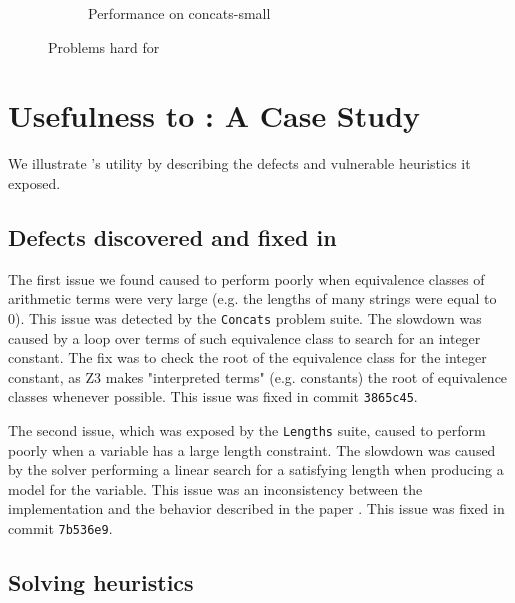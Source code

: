 \begin{figure}[h]
\begin{subfigure}{.5\textwidth}
            \label{fig:concats-small}
            \vspace{-0.25in}
            \caption{Performance on concats-small}
        \end{subfigure}
        \vspace{-0.1in}
        \caption{Problems hard for \us{}}
        \label{fig:z3str3-hard}
        \vspace{-0.3in}
    \end{figure}

    
\section{Usefulness to \us{}: A Case Study}
\vspace{-0.1in}

        We illustrate \fuzzer{}'s utility by describing the defects and vulnerable heuristics it exposed.

\vspace{-0.15in}
\subsection{Defects discovered and fixed in \us{}}
\vspace{-0.1in}

The first issue we found caused \us{} to perform poorly when equivalence classes 
of arithmetic terms were very large (e.g. the lengths of many strings were equal
to 0). This issue was detected by the \texttt{Concats} problem suite. The slowdown 
was caused by a loop over terms of such equivalence class to search for an 
integer constant. The fix was to check the root of the equivalence class for the 
integer constant, as Z3 makes "interpreted terms" (e.g. constants) the root of 
equivalence classes whenever possible. This issue was fixed in commit \texttt{3865c45}.


The second issue, which was exposed by the \texttt{Lengths} suite, caused \us{} to 
perform poorly when a variable has a large length constraint. The slowdown was 
caused by the solver performing a linear search for a satisfying length when 
producing a model for the variable. This issue was an inconsistency between the 
implementation and the behavior described in the \us{} paper \cite{z3str3}. 
This issue was fixed in commit 
\texttt{7b536e9}.    
    
\vspace{-0.15in}    
\subsection{Solving heuristics}
\vspace{-0.1in}

